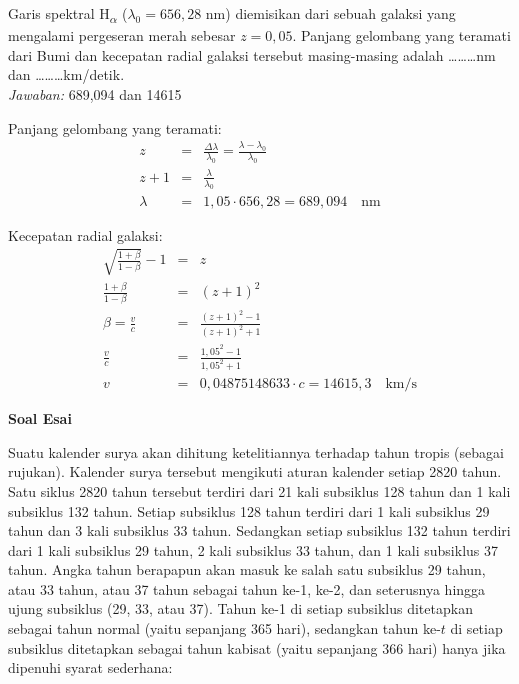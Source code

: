 \documentclass[11pt,fleqn]{exam}
\begin{document}
\begin{questions}
\vspace{0.3cm}
\question Garis spektral H\textsubscript{$\alpha$} ($\lambda_0=656,28$ nm) diemisikan dari sebuah galaksi yang mengalami pergeseran merah sebesar $z=0,05$. Panjang gelombang yang teramati dari Bumi dan kecepatan radial galaksi tersebut masing-masing adalah \ldots\ldots\ldots nm dan \ldots\ldots\ldots km/detik.\\

\textit{Jawaban: } 689,094 dan 14615

Panjang gelombang yang teramati:
\begin{eqnarray*}
z &=& \frac{\Delta \lambda}{\lambda_0} = \frac{\lambda - \lambda_0}{\lambda_0}\\
z + 1 &=& \frac{\lambda}{\lambda_0}\\
\lambda &=& 1,05 \cdot 656,28 = 689,094 \quad \text{nm}
\end{eqnarray*}

Kecepatan radial galaksi:
\begin{eqnarray*}
\sqrt{\frac{1 + \beta}{1 - \beta}} - 1 &=& z \\
\frac{1 + \beta}{1 - \beta} &=& (z + 1)^2 \\
\beta = \frac{v}{c} &=& \frac{(z + 1)^2 - 1}{(z + 1)^2 + 1} \\
\frac{v}{c} &=& \frac{1,05^2 - 1}{1,05^2 + 1} \\
v &=& 0,04875148633 \cdot c = 14615,3 \quad \text{km/s}
\end{eqnarray*}


\vspace{0.5cm}
\textbf{Soal Esai}

\question Suatu kalender surya akan dihitung ketelitiannya terhadap tahun tropis (sebagai rujukan). Kalender surya tersebut mengikuti aturan kalender setiap 2820 tahun. Satu siklus 2820 tahun tersebut terdiri dari 21 kali subsiklus 128 tahun dan 1 kali subsiklus 132 tahun. Setiap subsiklus 128 tahun terdiri dari 1 kali subsiklus 29 tahun dan 3 kali subsiklus 33 tahun. Sedangkan setiap subsiklus 132 tahun terdiri dari 1 kali subsiklus 29 tahun, 2 kali subsiklus 33 tahun, dan 1 kali subsiklus 37 tahun. Angka tahun berapapun akan masuk ke salah satu subsiklus 29 tahun, atau 33 tahun, atau 37 tahun sebagai tahun ke-1, ke-2, dan seterusnya hingga ujung subsiklus (29, 33, atau 37). Tahun ke-1 di setiap subsiklus ditetapkan sebagai tahun normal (yaitu sepanjang 365 hari), sedangkan tahun ke-$t$ di setiap subsiklus ditetapkan sebagai tahun kabisat (yaitu sepanjang 366 hari) hanya jika dipenuhi syarat sederhana:


\end{questions}
\end{document}
